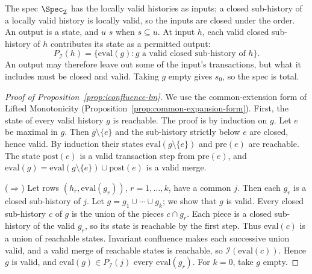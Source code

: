 The spec $\Spec_{\mathcal I}$ has the locally valid histories as inputs;
a closed sub-history of a locally valid history is locally valid, so the
inputs are closed under the order.
An output is a state, and $u$ \outrel $s$ when $s\subseteq u$.  At input $h$,
each valid closed sub-history of $h$ contributes its state as a permitted
output:
\[
  P_{\mathcal I}(h)=\{\mathrm{eval}(g):g\text{ a valid closed
  sub-history of }h\}.
\]
An output may therefore leave out some of the input's transactions, but what
it includes must be closed and valid.  Taking $g$ empty gives
$s_0$, so the spec is total.

\begin{proof}[Proof of Proposition~\ref{prop:iconfluence-lm}]
We use the common-extension form of Lifted Monotonicity
(Proposition~\ref{prop:common-expansion-form}).  First, the state of every
valid history $g$ is reachable.  The proof is by induction on $g$.  Let $e$ be
maximal in $g$.  Then $g\setminus\{e\}$ and the sub-history strictly below $e$
are closed, hence valid.  By induction their states
$\mathrm{eval}(g\setminus\{e\})$ and $\mathrm{pre}(e)$ are reachable.  The
state $\mathrm{post}(e)$ is a valid transaction step from $\mathrm{pre}(e)$,
and $\mathrm{eval}(g)=\mathrm{eval}(g\setminus\{e\})\cup\mathrm{post}(e)$ is a
valid merge.

($\Rightarrow$) Let rows $(h_r,\mathrm{eval}(g_r))$, $r=1,\ldots,k$, have a
common \indesc $j$.  Then each $g_r$ is a closed sub-history of $j$.  Let
$g=g_1\cup\cdots\cup g_k$; we show that $g$ is valid.  Every closed
sub-history $c$ of $g$ is the union of the pieces $c\cap g_r$.  Each piece is
a closed sub-history of the valid $g_r$, so its state is reachable by the
first step.  Thus $\mathrm{eval}(c)$ is a union of reachable states.
Invariant confluence makes each successive union valid, and a valid merge of
reachable states is reachable, so $\mathcal I(\mathrm{eval}(c))$.  Hence $g$
is valid, and $\mathrm{eval}(g)\in P_{\mathcal I}(j)$ \outrel every
$\mathrm{eval}(g_r)$.  For $k=0$, take $g$ empty.


\end{proof}
